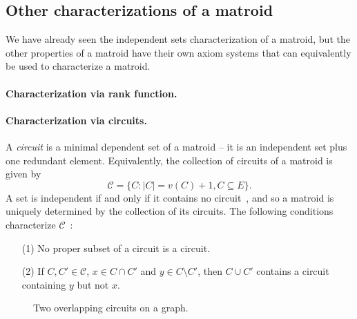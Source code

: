 \subsection{Other characterizations of a matroid} 
\label{sec:characterizations}

We have already seen the independent sets characterization of a matroid, but the other properties of a matroid have their own axiom systems that can equivalently be used to characterize a matroid.

\paragraph{Characterization via rank function.} \skelpar

\paragraph{Characterization via circuits.} A \textit{circuit} is a minimal dependent set of a matroid -- it is an independent set plus one redundant element. Equivalently, the collection of circuits of a matroid is given by
$$\mathcal{C} = \bigl\{ C : |C| = v(C) + 1, C\subseteq E \bigr\}.$$
A set is independent if and only if it contains no circuit~\cite{schrijver-2003}, and so a matroid is uniquely determined by the collection of its circuits. The following conditions characterize $\mathcal{C}$~\cite{whitney-1935}:
\begin{enumerate}
  \item[(1)] No proper subset of a circuit is a circuit.
  \item[(2)] If $C, C'\in\mathcal{C}$, $x\in C\cap C'$ and $y\in C\setminus C'$, then $C\cup C'$ contains a circuit containing $y$ but not $x$.
\end{enumerate}

\begin{figure}
  \centering
  \caption{Two overlapping circuits on a graph.}
  \label{fig:ex-graph-circuits}
\end{figure}

